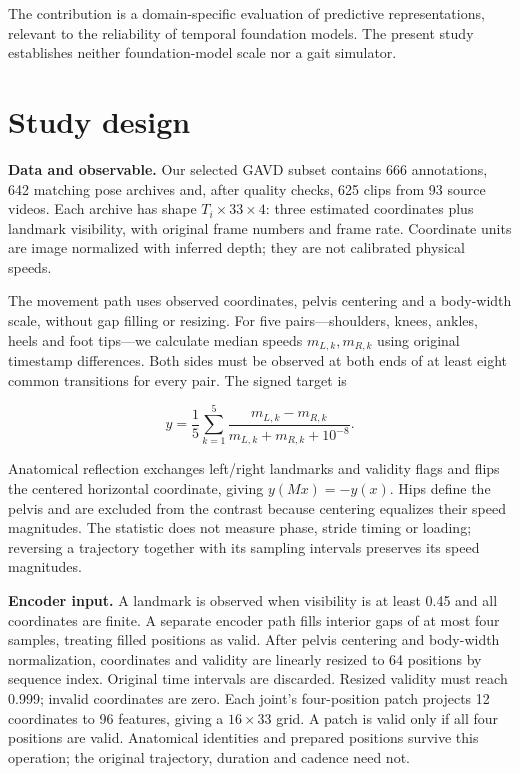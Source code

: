 \documentclass{article}
\begin{document}
The contribution is a domain-specific evaluation of predictive
representations, relevant to the reliability of temporal foundation
models. The present study establishes neither foundation-model scale nor
a gait simulator.

\section{Study design}\label{study-design}

\textbf{Data and observable.} Our selected GAVD subset \citep{gavd}
contains 666 annotations, 642 matching pose archives and, after quality
checks, 625 clips from 93 source videos. Each archive has shape
\(T_i\times33\times4\): three estimated coordinates plus landmark
visibility, with original frame numbers and frame rate. Coordinate units
are image normalized with inferred depth; they are not calibrated
physical speeds.

The movement path uses observed coordinates, pelvis centering and a
body-width scale, without gap filling or resizing. For five
pairs---shoulders, knees, ankles, heels and foot tips---we calculate
median speeds \(m_{L,k},m_{R,k}\) using original timestamp differences.
Both sides must be observed at both ends of at least eight common
transitions for every pair. The signed target is

\[y=\frac{1}{5}\sum_{k=1}^{5}\frac{m_{L,k}-m_{R,k}}{m_{L,k}+m_{R,k}+10^{-8}}.\]

Anatomical reflection exchanges left/right landmarks and validity flags
and flips the centered horizontal coordinate, giving \(y(Mx)=-y(x)\).
Hips define the pelvis and are excluded from the contrast because
centering equalizes their speed magnitudes. The statistic does not
measure phase, stride timing or loading; reversing a trajectory together
with its sampling intervals preserves its speed magnitudes.

\textbf{Encoder input.} A landmark is observed when visibility is at
least 0.45 and all coordinates are finite. A separate encoder path fills
interior gaps of at most four samples, treating filled positions as
valid. After pelvis centering and body-width normalization, coordinates
and validity are linearly resized to 64 positions by sequence index.
Original time intervals are discarded. Resized validity must reach
0.999; invalid coordinates are zero. Each joint's four-position patch
projects 12 coordinates to 96 features, giving a \(16\times33\) grid. A
patch is valid only if all four positions are valid. Anatomical
identities and prepared positions survive this operation; the original
trajectory, duration and cadence need not.
\end{document}
